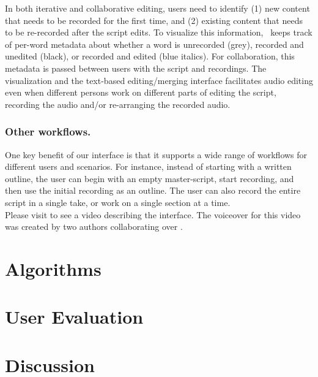 In both iterative and collaborative editing, users need to identify (1) new content that needs to be recorded for the first time, and (2) existing content that needs to be re-recorded after the script edits. To visualize this information,  \voicescript\ keeps track of per-word metadata about whether a word is unrecorded (grey), recorded and unedited (black), or recorded and edited (blue italics). For collaboration, this metadata is passed between users with the script and recordings. The visualization and the text-based  editing/merging interface facilitates audio editing even when different persons work on different parts of editing the script, recording the audio and/or re-arranging the recorded audio. \\ 

\subsubsection{Other workflows.} 
One key benefit of our interface is that it supports a wide range of workflows for different users and scenarios. For instance, instead of starting with a written outline, the user can begin with an empty master-script, start recording, and then use  the initial recording as an outline. The user can also record the entire script in a single take, or work on a single section at a time. \\

Please visit  to see a video describing the interface. The voiceover for this video was created by two authors collaborating over \voicescript . 

\section{Algorithms}

\section{User Evaluation}

\section{Discussion}
